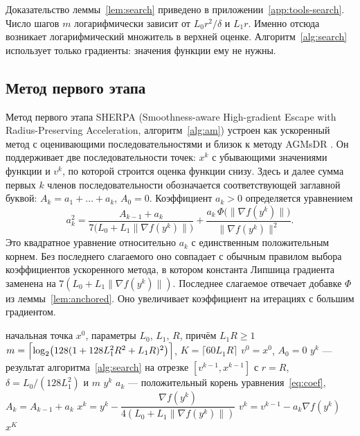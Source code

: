 \documentclass[11pt,a4paper]{article}
\newcommand{\norm}[1]{\|#1\|}
\begin{document}
Доказательство леммы~\ref{lem:search} приведено в приложении~\ref{app:tools-search}. Число шагов $m$ логарифмически зависит от $L_0r^2/\delta$ и $L_1r$. Именно отсюда возникает логарифмический множитель в верхней оценке. Алгоритм~\ref{alg:search} использует только градиенты: значения функции ему не нужны.

\subsection{Метод первого этапа}\label{sec:upper-method}

Метод первого этапа SHERPA (Smoothness-aware High-gradient Escape with Radius-Preserving Acceleration, алгоритм~\ref{alg:am}) устроен как ускоренный метод с оценивающими последовательностями \citep[§2.2]{nesterov2018lectures} и близок к методу AGMsDR \citep[алгоритм~1]{vankov2025optimizing}. Он поддерживает две последовательности точек: $x^k$ с убывающими значениями функции и $v^k$, по которой строится оценка функции снизу. Здесь и далее сумма первых $k$ членов последовательности обозначается соответствующей заглавной буквой: $A_k=a_1+\dots+a_k$, $A_0=0$. Коэффициент $a_k>0$ определяется уравнением
\begin{equation}\label{eq:coef}
 a_k^2=\frac{A_{k-1}+a_k}{7\bigl(L_0+L_1\norm{\nabla f(y^k)}\bigr)}+\frac{a_k\,\Phi\bigl(\norm{\nabla f(y^k)}\bigr)}{\norm{\nabla f(y^k)}^2} .
\end{equation}
Это квадратное уравнение относительно $a_k$ с единственным положительным корнем. Без последнего слагаемого оно совпадает с обычным правилом выбора коэффициентов ускоренного метода, в котором константа Липшица градиента заменена на $7(L_0+L_1\norm{\nabla f(y^k)})$. Последнее слагаемое отвечает добавке $\Phi$ из леммы~\ref{lem:anchored}. Оно увеличивает коэффициент на итерациях с большим градиентом.

\begin{algorithm}[ht]
\caption{SHERPA (первый этап): ускоренный метод с неточным одномерным поиском}\label{alg:am}
\begin{algorithmic}[1]
\Require начальная точка $x^0$, параметры $L_0$, $L_1$, $R$, причём $L_1R\ge1$
\State $m=\Bigl\lceil\log_2\bigl(128(1+128L_1^2R^2+L_1R)^2\bigr)\Bigr\rceil$, $K=\lceil60L_1R\rceil$
\State $v^0=x^0$, $A_0=0$
 \State $y^k$ --- результат алгоритма~\ref{alg:search} на отрезке $[v^{k-1},x^{k-1}]$ с $r=R$, $\delta=L_0/(128L_1^2)$ и $m$
  \State \Return $y^k$
 \EndIf
 \State $a_k$ --- положительный корень уравнения~\eqref{eq:coef}, $A_k=A_{k-1}+a_k$
 \State $x^k=y^k-\dfrac{\nabla f(y^k)}{4(L_0+L_1\norm{\nabla f(y^k)})}$
 \State $v^k=v^{k-1}-a_k\nabla f(y^k)$
\EndFor
\State \Return $x^K$
\end{algorithmic}
\end{algorithm}
\end{document}
